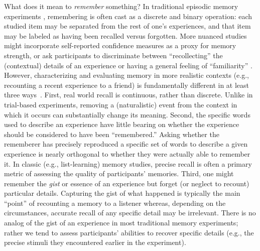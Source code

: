 \documentclass{article}
\begin{document}
What does it mean to \textit{remember} something? In traditional episodic memory experiments \citep[e.g., list-learning or trial-based experiments;][]{Murd62a, Kaha96}, remembering is often cast as a discrete and binary operation: each studied item may be separated from the rest of one's experiences, and that item may be labeled as having been recalled versus forgotten. More nuanced studies might incorporate self-reported confidence measures as a proxy for memory strength, or ask participants to discriminate between ``recollecting'' the (contextual) details of an experience or having a general feeling of ``familiarity'' \citep{Yone02}. However, characterizing and evaluating memory in more realistic contexts (e.g., recounting a recent experience to a friend) is fundamentally different in at least three ways~\citep[also see][for a review]{KoriGold94}.  First, real world recall is continuous, rather than discrete.  Unlike in trial-based experiments, removing a (naturalistic) event from the context in which it occurs can substantially change its meaning.  Second, the specific words used to describe an experience have little bearing on whether the experience should be considered to have been ``remembered.''  Asking whether the rememberer has precisely reproduced a specific set of words to describe a given experience is nearly orthogonal to whether they were actually able to remember it.  In classic (e.g., list-learning) memory studies, precise recall is often a primary metric of assessing the quality of participants' memories.  Third, one might remember the \textit{gist} or essence of an experience but forget (or neglect to recount) particular details.  Capturing the gist of what happened is typically the main ``point'' of recounting a memory to a listener whereas, depending on the circumstances, accurate recall of any specific detail may be irrelevant.  There is no analog of the gist of an experience in most traditional memory experiments; rather we tend to assess participants' abilities to recover specific details (e.g., the precise stimuli they encountered earlier in the experiment).
\end{document}
